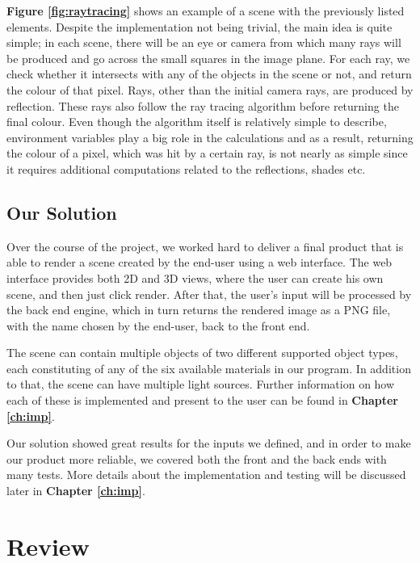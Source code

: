 \documentclass[a4paper]{report}
\begin{document}
	\par \textbf{Figure \ref{fig:raytracing}} shows an example of a scene with the previously listed elements. Despite the implementation not being trivial, the main idea is quite simple; in each scene, there will be an eye or camera from which many rays will be produced and go across the small squares in the image plane. For each ray, we check whether it intersects with any of the objects in the scene or not, and return the colour of that pixel. Rays, other than the initial camera rays, are produced by reflection. These rays also follow the ray tracing algorithm before returning the final colour. Even though the algorithm itself is relatively simple to describe, environment variables play a big role in the calculations and as a result, returning the colour of a pixel, which was hit by a certain ray, is not nearly as simple since it requires additional computations related to the reflections, shades etc.
	
	\section{Our Solution}
	Over the course of the project, we worked hard to deliver a final product that is able to render a scene created by the end-user using a web interface. The web interface provides both 2D and 3D views, where the user can create his own scene, and then just click render. After that, the user's input will be processed by the back end engine, which in turn returns the rendered image as a PNG file, with the name chosen by the end-user, back to the front end.\newline  
	
	\par The scene can contain multiple objects of two different supported object types, each constituting of any of the six available materials in our program. In addition to that, the scene can have multiple light sources. Further information on how each of these is implemented and present to the user can be found in \textbf{Chapter \ref{ch:imp}}.\newline
	
	\par Our solution showed great results for the inputs we defined, and in order to make our product more reliable, we covered both the front and the back ends with many tests. More details about the implementation and testing will be discussed later in \textbf{Chapter \ref{ch:imp}}.
	
	\chapter{Review}
\end{document}
